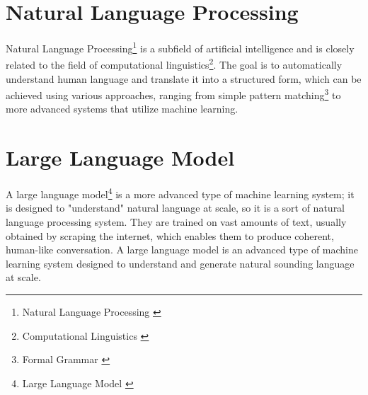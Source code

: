 \section{Natural Language Processing}
Natural Language Processing\footnote{Natural Language Processing \cite{nlp}} is a subfield of artificial intelligence  
and is closely related to the field of computational linguistics\footnote{Computational Linguistics \cite{cl}}.  
The goal is to automatically understand human language and translate it into  
a structured form, which can be achieved using various approaches,  
ranging from simple pattern matching\footnote{Formal Grammar \cite{pm}}  
to more advanced systems that utilize machine learning.

\section{Large Language Model}
A large language model\footnote{Large Language Model \cite{llm}}
is a more advanced type of machine learning system;
it is designed to "understand" natural language at scale,
so it is a sort of natural language processing system.
They are trained on vast amounts of text, usually obtained by scraping the internet,
which enables them to produce coherent, human-like conversation.
A large language model is an advanced type of machine learning system  
designed to understand and generate natural sounding language at scale.
